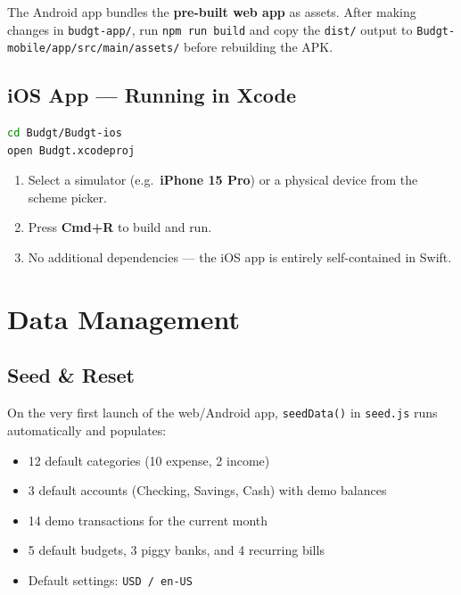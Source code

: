 \documentclass[12pt, a4paper]{article}
\begin{document}
\begin{notebox}
The Android app bundles the \textbf{pre-built web app} as assets. After making changes in \texttt{budgt-app/}, run \texttt{npm run build} and copy the \texttt{dist/} output to \texttt{Budgt-mobile/app/src/main/assets/} before rebuilding the APK.
\end{notebox}

\subsection{iOS App --- Running in Xcode}

\begin{lstlisting}[language=bash, caption={Opening the Xcode Project}]
cd Budgt/Budgt-ios
open Budgt.xcodeproj
\end{lstlisting}

\begin{enumerate}[leftmargin=1.5em]
  \item Select a simulator (e.g.\ \textbf{iPhone 15 Pro}) or a physical device from the scheme picker.
  \item Press \textbf{Cmd+R} to build and run.
  \item No additional dependencies --- the iOS app is entirely self-contained in Swift.
\end{enumerate}

\section{Data Management}

\subsection{Seed \& Reset}

On the very first launch of the web/Android app, \texttt{seedData()} in \texttt{seed.js} runs automatically and populates:
\begin{itemize}[leftmargin=1.5em]
  \item 12 default categories (10 expense, 2 income)
  \item 3 default accounts (Checking, Savings, Cash) with demo balances
  \item 14 demo transactions for the current month
  \item 5 default budgets, 3 piggy banks, and 4 recurring bills
  \item Default settings: \texttt{USD / en-US}
\end{itemize}
\end{document}
